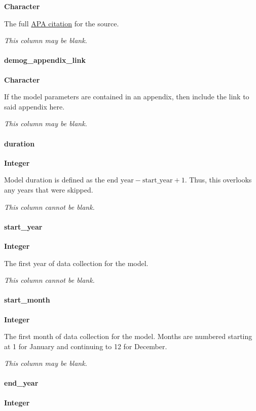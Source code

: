 \documentclass[]{article}
\let\oldparagraph\paragraph
\renewcommand{\paragraph}[1]{\oldparagraph{#1}\mbox{}}
\begin{document}
\textbf{Character}

The full \href{http://www.bibme.org/apa}{APA citation} for the source.

\emph{This column may be blank.}

\paragraph{demog\_appendix\_link}\label{demog_appendix_link}

\textbf{Character}

If the model parameters are contained in an appendix, then include the
link to said appendix here.

\emph{This column may be blank.}

\paragraph{duration}\label{duration}

\textbf{Integer}

Model duration is defined as the
\(\text{end year} - \text{start_year} + 1\). Thus, this overlooks any
years that were skipped.

\emph{This column cannot be blank.}

\paragraph{start\_year}\label{start_year}

\textbf{Integer}

The first year of data collection for the model.

\emph{This column cannot be blank.}

\paragraph{start\_month}\label{start_month}

\textbf{Integer}

The first month of data collection for the model. Months are numbered
starting at 1 for January and continuing to 12 for December.

\emph{This column may be blank.}

\paragraph{end\_year}\label{end_year}

\textbf{Integer}
\end{document}
